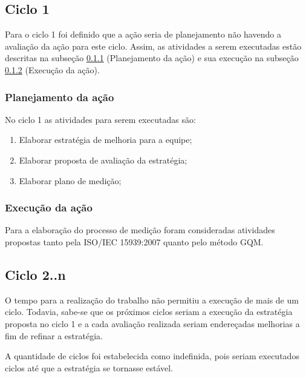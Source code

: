 \subsection{Ciclo 1}

	Para o ciclo 1 foi definido que a ação seria de planejamento não havendo a avaliação da ação para este ciclo. Assim, as atividades a serem
	executadas estão descritas na subseção \ref{sub:planejamento} (Planejamento da ação) e sua execução na subseção \ref{sub:execucao} (Execução da ação).

	\subsubsection{Planejamento da ação}
		\label{sub:planejamento}

		No ciclo 1 as atividades para serem executadas são:

		\begin{enumerate}

			\item Elaborar estratégia de melhoria para a equipe;

			\item Elaborar proposta de avaliação da estratégia;

			\item Elaborar plano de medição;


		\end{enumerate}


	\subsubsection{Execução da ação}
		\label{sub:execucao}



		
		 Para a elaboração do processo de medição foram consideradas atividades propostas tanto pela ISO/IEC 15939:2007 
		 quanto pelo método GQM.

\subsection{Ciclo 2..n}

	O tempo para a realização do trabalho não permitiu a execução de mais de um ciclo. Todavia,
	sabe-se que os próximos ciclos seriam a execução da estratégia proposta no ciclo 1 e a cada avaliação realizada
	seriam endereçadas melhorias a fim de refinar a estratégia.

	A quantidade de ciclos foi estabelecida como indefinida, pois seriam executados ciclos até que a estratégia 
	se tornasse estável.

